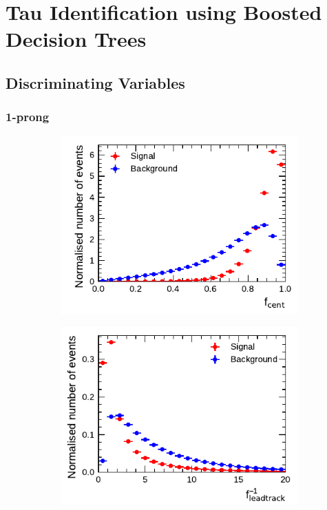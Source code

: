 \clearpage
\section{Tau Identification using Boosted Decision Trees}
\label{app:tauid}
\subsection{Discriminating Variables}
\label{app:tauid_vars}

\FloatBarrier
\subsubsection{1-prong}
\begin{figure}[htbp]
  \begin{subfigure}{0.5\textwidth}
    \centering
    \includegraphics{./figures/baseline_bdt_vars/1p/centFrac.pdf}
  \end{subfigure}%
  \begin{subfigure}{0.5\textwidth}
    \centering
    \includegraphics{./figures/baseline_bdt_vars/1p/etOverPtLeadTrk.pdf}

\end{subfigure}
\end{figure}
